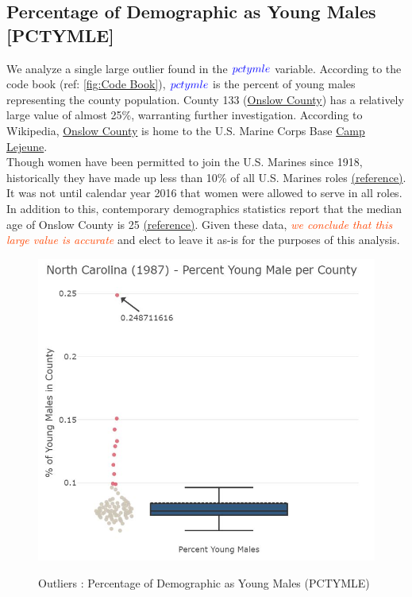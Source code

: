 \pagebreak

\subsection{Percentage of Demographic as Young Males [PCTYMLE]}

We analyze a single large outlier found in the $\textcolor{Blue}{pctymle}$ variable.  According to the code book (ref: \ref{fig:Code Book}), $\textcolor{Blue}{pctymle}$ is the percent of young males representing the county population.  County 133 (\href{https://www.onslowcountync.gov/}{Onslow County}) has a relatively large value of almost 25\%, warranting further investigation.  According to Wikipedia, \href{https://en.wikipedia.org/wiki/Onslow_County,_North_Carolina}{Onslow County} is home to the U.S. Marine Corps Base \href{https://www.lejeune.marines.mil/}{Camp Lejeune}.\\

Though women have been permitted to join the U.S. Marines since 1918, historically they have made up less than 10\% of all U.S. Marines roles \href{https://en.wikipedia.org/wiki/Women_in_the_United_States_Marines}{(reference)}. It was not until calendar year 2016 that women were allowed to serve in all roles.  In addition to this, contemporary demographics statistics report that the median age of Onslow County is 25 \href{https://en.wikipedia.org/wiki/Onslow_County,_North_Carolina}{(reference)}.  Given these data, \textcolor{OrangeRed}{\textit{we conclude that this large value is accurate}} and elect to leave it as-is for the purposes of this analysis.

\vspace*{0.5in}
\begin{figure}[!ht]
	\centering
	\includegraphics{images/EDA_pctymle_uncorrected.jpg}
	\label{fig:EDA PCTYMLE variable uncorrected}
	\caption{Outliers : Percentage of Demographic as Young Males (PCTYMLE)}
\end{figure}

